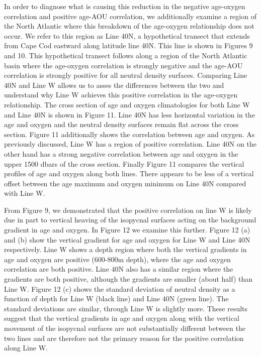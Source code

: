 \documentclass{ametsoc}
\begin{document}
In order to diagnose what is causing this reduction in the negative age-oxygen correlation and positive age-AOU correlation, we additionally examine a region of the North Atlantic where this breakdown of the age-oxygen relationship does not occur. We refer to this region as Line 40N, a hypothetical transect that extends from Cape Cod eastward along latitude line 40N. This line is shown in Figures 9 and 10. This hypothetical transect follows along a region of the North Atlantic basin where the age-oxygen correlation is strongly negative and the age-AOU correlation is strongly positive for all neutral density surfaces. Comparing Line 40N and Line W allows us to asses the differences between the two and understand why Line W achieves this positive correlation in the age-oxygen relationship. The cross section of age and oxygen climatologies for both Line W and Line 40N is shown in Figure 11. Line 40N has less horizontal variation in the age and oxygen and the neutral density surfaces remain flat across the cross section. Figure 11 additionally shows the correlation between age and oxygen. As previously discussed, Line W has a region of positive correlation. Line 40N on the other hand has a strong negative correlation between age and oxygen in the upper 1500 dbars of the cross section. Finally Figure 11 compares the vertical profiles of age and oxygen along both lines. There appears to be less of a vertical offset between the age maximum and oxygen minimum on Line 40N compared with Line W.

From Figure 9, we demonstrated that the positive correlation on line W is likely due in part to vertical heaving of the isopycnal surfaces acting on the background gradient in age and oxygen. In Figure 12 we examine this further. Figure 12 (a) and (b) show the vertical gradient for age and oxygen for Line W and Line 40N respectively. Line W shows a depth region where both the vertical gradients in age and oxygen are positive (600-800m depth), where the age and oxygen correlation are both positive. Line 40N also has a similar region where the gradients are both positive, although the gradients are smaller (about half) than Line W. Figure 12 (c) shows the standard deviation of neutral density as a function of depth for Line W (black line) and Line 40N (green line). The standard deviations are similar, through Line W is slightly more. These results suggest that the vertical gradients in age and oxygen along with the vertical movement of the isopycnal surfaces are not substantially different between the two lines and are therefore not the primary reason for the positive correlation along Line W.
\end{document}
